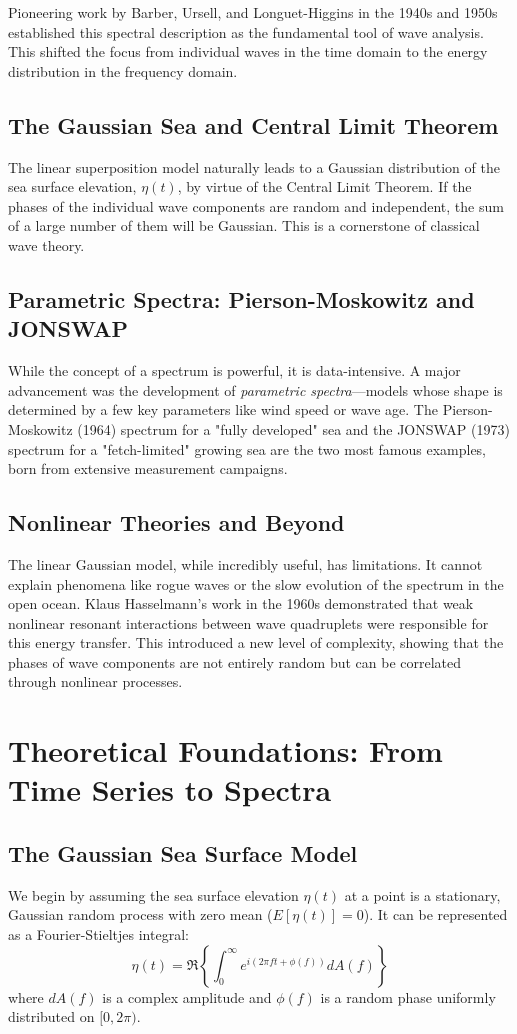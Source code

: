 \documentclass[11pt,letterpaper]{article}
\begin{document}
Pioneering work by Barber, Ursell, and Longuet-Higgins in the 1940s and 1950s established this spectral description as the fundamental tool of wave analysis. This shifted the focus from individual waves in the time domain to the energy distribution in the frequency domain.

\subsection{The Gaussian Sea and Central Limit Theorem}
The linear superposition model naturally leads to a Gaussian distribution of the sea surface elevation, $\eta(t)$, by virtue of the Central Limit Theorem. If the phases of the individual wave components are random and independent, the sum of a large number of them will be Gaussian. This is a cornerstone of classical wave theory.

\subsection{Parametric Spectra: Pierson-Moskowitz and JONSWAP}
While the concept of a spectrum is powerful, it is data-intensive. A major advancement was the development of \textit{parametric spectra}—models whose shape is determined by a few key parameters like wind speed or wave age. The Pierson-Moskowitz (1964) spectrum for a "fully developed" sea and the JONSWAP (1973) spectrum for a "fetch-limited" growing sea are the two most famous examples, born from extensive measurement campaigns.

\subsection{Nonlinear Theories and Beyond}
The linear Gaussian model, while incredibly useful, has limitations. It cannot explain phenomena like rogue waves or the slow evolution of the spectrum in the open ocean. Klaus Hasselmann's work in the 1960s demonstrated that weak nonlinear resonant interactions between wave quadruplets were responsible for this energy transfer. This introduced a new level of complexity, showing that the phases of wave components are not entirely random but can be correlated through nonlinear processes.

\section{Theoretical Foundations: From Time Series to Spectra}
\subsection{The Gaussian Sea Surface Model}
We begin by assuming the sea surface elevation $\eta(t)$ at a point is a stationary, Gaussian random process with zero mean ($E[\eta(t)] = 0$). It can be represented as a Fourier-Stieltjes integral:
\begin{equation}
\eta(t) = \Re \left\{ \int_{0}^{\infty} e^{i(2\pi ft + \phi(f))}  dA(f) \right\}
\end{equation}
where $dA(f)$ is a complex amplitude and $\phi(f)$ is a random phase uniformly distributed on $[0, 2\pi)$.
\end{document}
